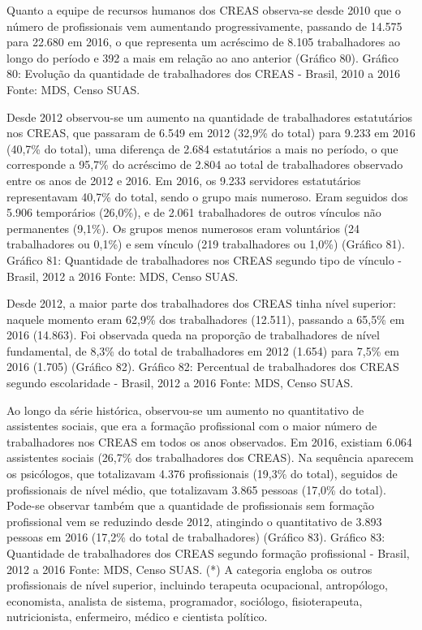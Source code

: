 \documentclass[
  brazilian]{report}
\begin{document}
Quanto a equipe de recursos humanos dos CREAS observa-se desde 2010 que
o número de profissionais vem aumentando progressivamente, passando de
14.575 para 22.680 em 2016, o que representa um acréscimo de 8.105
trabalhadores ao longo do período e 392 a mais em relação ao ano
anterior (Gráfico 80). Gráfico 80: Evolução da quantidade de
trabalhadores dos CREAS - Brasil, 2010 a 2016 Fonte: MDS, Censo SUAS.

Desde 2012 observou-se um aumento na quantidade de trabalhadores
estatutários nos CREAS, que passaram de 6.549 em 2012 (32,9\% do total)
para 9.233 em 2016 (40,7\% do total), uma diferença de 2.684
estatutários a mais no período, o que corresponde a 95,7\% do acréscimo
de 2.804 ao total de trabalhadores observado entre os anos de 2012 e
2016. Em 2016, os 9.233 servidores estatutários representavam 40,7\% do
total, sendo o grupo mais numeroso. Eram seguidos dos 5.906 temporários
(26,0\%), e de 2.061 trabalhadores de outros vínculos não permanentes
(9,1\%). Os grupos menos numerosos eram voluntários (24 trabalhadores ou
0,1\%) e sem vínculo (219 trabalhadores ou 1,0\%) (Gráfico 81). Gráfico
81: Quantidade de trabalhadores nos CREAS segundo tipo de vínculo -
Brasil, 2012 a 2016 Fonte: MDS, Censo SUAS.

Desde 2012, a maior parte dos trabalhadores dos CREAS tinha nível
superior: naquele momento eram 62,9\% dos trabalhadores (12.511),
passando a 65,5\% em 2016 (14.863). Foi observada queda na proporção de
trabalhadores de nível fundamental, de 8,3\% do total de trabalhadores
em 2012 (1.654) para 7,5\% em 2016 (1.705) (Gráfico 82). Gráfico 82:
Percentual de trabalhadores dos CREAS segundo escolaridade - Brasil,
2012 a 2016 Fonte: MDS, Censo SUAS.

Ao longo da série histórica, observou-se um aumento no quantitativo de
assistentes sociais, que era a formação profissional com o maior número
de trabalhadores nos CREAS em todos os anos observados. Em 2016,
existiam 6.064 assistentes sociais (26,7\% dos trabalhadores dos CREAS).
Na sequência aparecem os psicólogos, que totalizavam 4.376 profissionais
(19,3\% do total), seguidos de profissionais de nível médio, que
totalizavam 3.865 pessoas (17,0\% do total). Pode-se observar também que
a quantidade de profissionais sem formação profissional vem se reduzindo
desde 2012, atingindo o quantitativo de 3.893 pessoas em 2016 (17,2\% do
total de trabalhadores) (Gráfico 83). Gráfico 83: Quantidade de
trabalhadores dos CREAS segundo formação profissional - Brasil, 2012 a
2016 Fonte: MDS, Censo SUAS. (*) A categoria engloba os outros
profissionais de nível superior, incluindo terapeuta ocupacional,
antropólogo, economista, analista de sistema, programador, sociólogo,
fisioterapeuta, nutricionista, enfermeiro, médico e cientista político.
\end{document}
